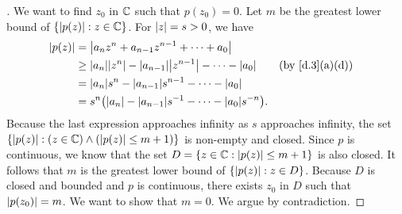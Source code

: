 \begin{proof}[]
  We want to find \(z_0\) in \(\mathbb{C}\) such that \(p(z_0) = 0\).
  Let \(m\) be the greatest lower bound of \(\left\lbrace\left\lvert p(z)\right\rvert : z \in \mathbb{C}\right\rbrace\).
  For \(\left\lvert z\right\rvert = s > 0\), we have
  \begin{align*}
    \abs{p(z)} & = \abs{a_n z^n + a_{n - 1} z^{n - 1} + \cdots + a_0}                                                              \\
               & \geq \abs{a_n} \abs{z^n} - \abs{a_{n - 1}} \abs{z^{n - 1}} - \cdots - \abs{a_0} &  & \text{(by \cref{d.3}(a)(d))} \\
               & = \abs{a_n} s^n - \abs{a_{n - 1}} s^{n - 1} - \cdots - \abs{a_0}                                                  \\
               & = s^{n} \pa{\abs{a_n} - \abs{a_{n - 1}} s^{-1} - \cdots - \abs{a_0} s^{-n}}.
  \end{align*}
  Because the last expression approaches infinity as \(s\) approaches infinity, the set \(\left\lbrace\left\lvert p(z)\right\rvert : (z \in \mathbb{C}) \land (\left\lvert p(z)\right\rvert \leq m + 1)\right\rbrace\) is non-empty and closed.
  Since \(p\) is continuous, we know that the set \(D = \left\lbrace z \in \mathbb{C} : \left\lvert p(z)\right\rvert \leq m + 1\right\rbrace\) is also closed.
  It follows that \(m\) is the greatest lower bound of \(\left\lbrace\left\lvert p(z)\right\rvert : z \in D\right\rbrace\).
  Because \(D\) is closed and bounded and \(p\) is continuous, there exists \(z_0\) in \(D\) such that \(\left\lvert p(z_0)\right\rvert = m\).
  We want to show that \(m = 0\).
  We argue by contradiction.


\end{proof}
